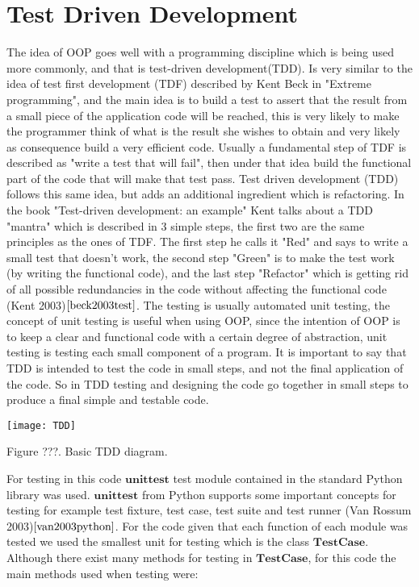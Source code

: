 \documentclass{article}
\begin{document}
\section{Test Driven Development}
The idea of OOP goes well with a programming discipline which is being used more commonly, and that is test-driven development(TDD). Is very similar to the idea of test first development (TDF) described by Kent Beck in "Extreme programming", and the main idea is to build a test to assert that the result from a small piece of the application code will be reached, this is very likely to make the programmer think of what is the result she wishes to obtain and very likely as consequence build a very efficient code. Usually a fundamental  step of TDF is described as "write a test that will fail", then under that idea build the functional part of the code that will make that test pass. Test driven development (TDD) follows this same idea, but adds an additional ingredient which is refactoring. In the book "Test-driven development: an example" Kent talks about a TDD "mantra" which is described in 3 simple steps, the first two are the same principles as the ones of TDF. The first step he calls it "Red" and says to write a small test that doesn't work, the second step "Green" is to make the test work (by writing the functional code), and the last step "Refactor" which is getting rid of all possible redundancies in the code without affecting the functional code (Kent 2003)$\cite{beck2003test}$. The testing is usually automated unit testing, the concept of unit testing is useful when using OOP, since the intention of OOP is to keep a clear and functional code with a certain degree of abstraction, unit testing is testing each small component of a program. It is important to say that TDD is intended to test the code in small steps, and not the final application of the code. So in TDD testing and designing the code go together in small steps to produce a final simple and testable code. 

\begin{center}
	\texttt{[image: TDD]}

Figure ???. Basic TDD diagram.
\end{center}

For testing in this code $\textbf{unittest}$ test module contained in the standard Python library was used. $\textbf{unittest}$ from Python supports some important concepts for testing for example test fixture, test case, test suite and test runner (Van Rossum 2003)$\cite{van2003python}$. For the code given that each function of each module was tested we used the smallest unit for testing which is the class $\textbf{TestCase}$. Although there exist many methods for testing in $\textbf{TestCase}$,  for this code the main methods used when testing were:
\end{document}
